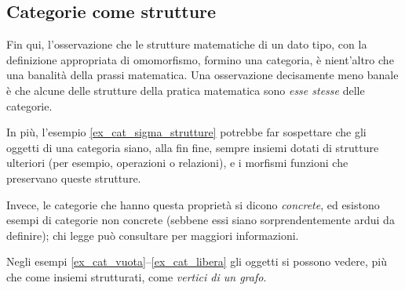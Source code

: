 \subsection{Categorie come strutture}\label{ssec:categorie_strutture}
Fin qui, l'osservazione che le strutture matematiche di un dato tipo, con la definizione appropriata di omomorfismo, formino una categoria, è nient'altro che una banalità della prassi matematica. Una osservazione decisamente meno banale è che alcune delle strutture della pratica matematica sono \emph{esse stesse} delle categorie.

In più, l'esempio \ref{ex_cat_sigma_strutture} potrebbe far sospettare che gli oggetti di una categoria siano, alla fin fine, sempre insiemi dotati di strutture ulteriori (per esempio, operazioni o relazioni), e i morfismi funzioni che preservano queste strutture.

Invece, le categorie che hanno questa proprietà si dicono \emph{concrete}, ed esistono esempi di categorie non concrete (sebbene essi siano sorprendentemente ardui da definire); chi legge può consultare \cite{Freyd1973,Kuera1971} per maggiori informazioni.

Negli esempi \ref{ex_cat_vuota}--\ref{ex_cat_libera} gli oggetti si possono vedere, più che come insiemi strutturati, come \emph{vertici di un grafo}.


